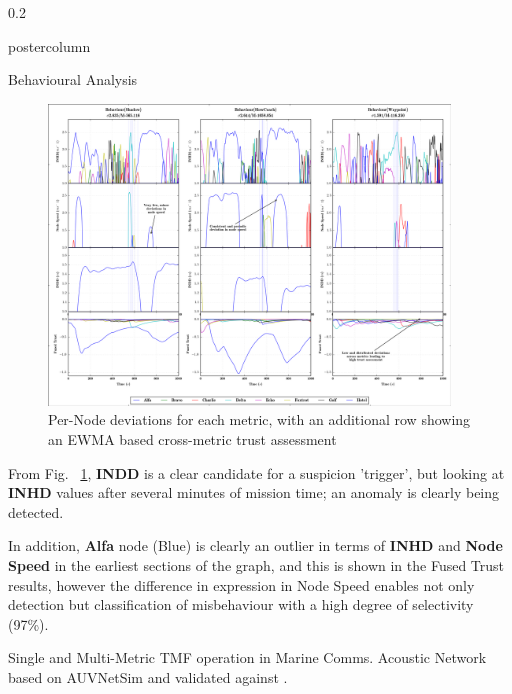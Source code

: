 \documentclass[final,hyperref={pdfpagelabels=false}]{beamer}
\def\colwidth{0.2\linewidth}
\begin{document}
\begin{frame}[fragile]
\begin{columns}[T]
\begin{column}{\colwidth}
\begin{beamercolorbox}[center,wd=\textwidth]{postercolumn}
\begin{minipage}[T]{.98\textwidth}
{\begin{block}{Behavioural Analysis}
							\begin{figure}
								\includegraphics[width=0.95\textwidth]{figures/Bad_Alfa_Fusion}
								\caption{Per-Node deviations for each metric, with an additional row showing an EWMA based cross-metric trust assessment }
								\label{fig:Bad_Alfa_Fusion}
							\end{figure}
														
							From Fig. ~\ref{fig:Bad_Alfa_Fusion}, \textbf{INDD} is a clear candidate for a suspicion 'trigger', but looking at \textbf{INHD} values after several minutes of mission time; an anomaly is clearly being detected. 
														
							\vspace{0.25\baselineskip}
														
							In addition, \textbf{Alfa} node (Blue) is clearly an outlier in terms of \textbf{INHD} and \textbf{Node Speed} in the earliest sections of the graph, and this is shown in the Fused Trust results, however the difference in expression in Node Speed enables not only detection but classification of misbehaviour with a high degree of selectivity (97\%).
														
						\end{block}
						
						\begin{block}{Single and Multi-Metric TMF operation in Marine Comms.}
							Acoustic Network based on AUVNetSim \cite{Miquel2008} and validated against \cite{Stefanov2011}.
							
							\vspace{0.25\baselineskip}
														

\end{block}}
\end{minipage}
\end{beamercolorbox}
\end{column}
\end{columns}
\end{frame}
\end{document}
